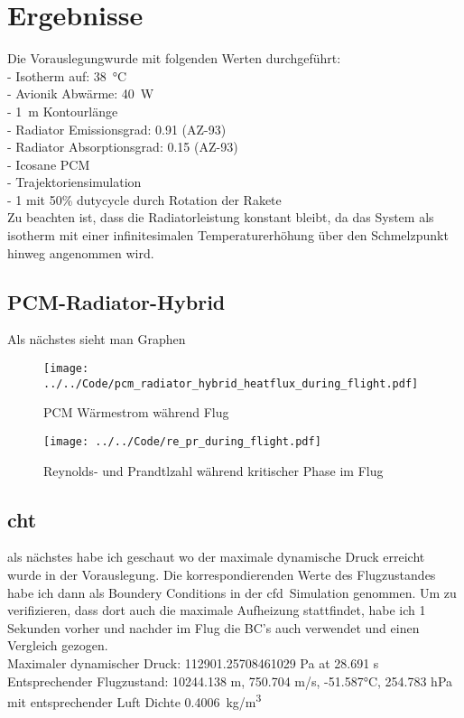 \chapter{Ergebnisse}\label{chap:Ergebnisse}
Die Vorauslegungwurde mit folgenden Werten durchgeführt:\\
- Isotherm auf: \SI{38}{\celsius}\\
- Avionik Abwärme: \SI{40}{W}\\
- \SI{1}{m} Kontourlänge\\
- Radiator Emissionsgrad: \SI{0,91}{} (AZ-93)\\
- Radiator Absorptionsgrad: \SI{0,15}{} (AZ-93)\\
- Icosane PCM\\
- Trajektoriensimulation\\
- \SI{1}{} mit 50\% dutycycle durch Rotation der Rakete\\
Zu beachten ist, dass die Radiatorleistung konstant bleibt, da das System als isotherm mit einer
infinitesimalen Temperaturerhöhung über den Schmelzpunkt hinweg angenommen wird.
\section{PCM-Radiator-Hybrid}\label{sec:pcmRadiatorHybridErgebnisse}
Als nächstes sieht man Graphen
\begin{figure}[H]
  \centering
  \texttt{[image: ../../Code/pcm\_radiator\_hybrid\_heatflux\_during\_flight.pdf]}\label{fig:pcm_waermestrom_flugsimulation}
  \caption{PCM Wärmestrom während Flug}
  \texttt{[image: ../../Code/re\_pr\_during\_flight.pdf]}\label{fig:re_pr_flugsimulation}
  \caption{Reynolds- und Prandtlzahl während kritischer Phase im Flug}
\end{figure}
\section{\ac{cht}}
als nächstes habe ich geschaut wo der maximale dynamische Druck erreicht wurde in der Vorauslegung. Die korrespondierenden Werte des Flugzustandes
habe ich dann als Boundery Conditions in der \ac{cfd}~Simulation genommen.
Um zu verifizieren, dass dort auch die maximale Aufheizung stattfindet, habe ich 1 Sekunden vorher und nachder
im Flug die BC's auch verwendet und einen Vergleich gezogen.\\

Maximaler dynamischer Druck: 112901.25708461029 Pa at 28.691 s\\
Entsprechender Flugzustand: 10244.138 m, 750.704 m/s, -51.587°C, 254.783 hPa mit entsprechender Luft Dichte \SI{0.4006}{kg/m^3}\\


